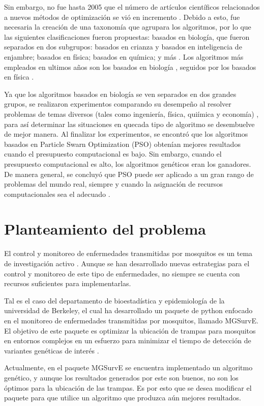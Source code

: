 \documentclass[letterpaper, 10pt, conference]{ieeeconf}
\begin{document}
Sin embargo, no fue hasta 2005 que el número de artículos científicos relacionados a nuevos métodos de optimización se vió en incremento \cite{Taxonomies}. Debido a esto, fue necesaria la creación de una taxonomía que agrupara los algoritmos, por lo que las siguientes clasificaciones fueron propuestas: basados en biología, que fueron separados en dos subgrupos: basados en crianza y basados en inteligencia de enjambre; basados en física; basados en química; y más \cite{Taxonomies}. Los algoritmos más empleados en ultimos años son los basados en biología \cite{Taxonomies}, seguidos por los basados en física \cite{PhysicsBasedRev}.

Ya que los algoritmos basados en biología se ven separados en dos grandes grupos, se realizaron experimentos comparando su desempeño al resolver problemas de temas diversos (tales como ingeniería, física, quiímica y economía) , para así determinar las situaciones en quecada tipo de algoritmo se desembuelve de mejor manera. Al finalizar los experimentos, se encontró que los algoritmos basados en Particle Swarn Optimization (PSO) obtenían mejores resultados cuando el presupuesto computacional es bajo. Sin embargo, cuando el presupuesto computacional es alto, los algoritmos genéticos eran los ganadores. De manera general, se concluyó que PSO puede ser aplicado a un gran rango de problemas del mundo real, siempre y cuando la asignación de recursos computacionales sea el adecuado \cite{SwarmVsEvol}.

\section{Planteamiento del problema}
El control y monitoreo de enfermedades transmitidas por mosquitos es un tema de investigación activo \cite{AltStrategies}. Aunque se han desarrollado nuevas estrategias para el control y monitoreo de este tipo de enfermedades, no siempre se cuenta con recursos suficientes para implementarlas.

Tal es el caso del departamento de bioestadística y epidemiología de la universidad de Berkeley, el cual ha desarrollado un paquete de python enfocado en el monitoreo de enfermedades transmitidas por mosquitos, llamado MGSurvE. El objetivo de este paquete es optimizar la ubicación de trampas para mosquitos en entornos complejos en un esfuerzo para minimizar el tiempo de detección de variantes genéticas de interés \cite{MGSurvEPyPi}.

Actualmente, en el paquete MGSurvE se encuentra implementado un algoritmo genético, y aunque los resultados generados por este son buenos, no son los óptimos para la ubicación de las trampas. Es por esto que se desea modificar el paquete para que utilice un algoritmo que produzca aún mejores resultados. 
\end{document}
